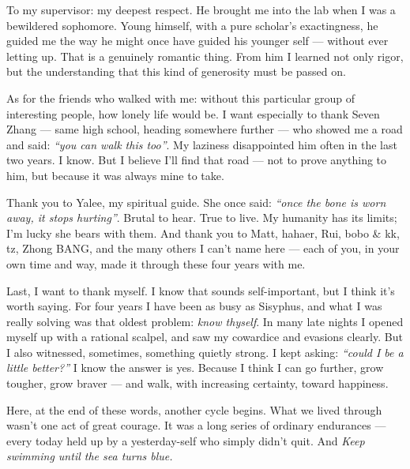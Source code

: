 To my supervisor: my deepest respect. He brought me into the lab when I was a bewildered sophomore. Young himself, with a pure scholar's exactingness, he guided me the way he might once have guided his younger self --- without ever letting up. That is a genuinely romantic thing. From him I learned not only rigor, but the understanding that this kind of generosity must be passed on.

As for the friends who walked with me: without this particular group of interesting people, how lonely life would be. I want especially to thank Seven Zhang --- same high school, heading somewhere further --- who showed me a road and said: \textit{``you can walk this too''}. My laziness disappointed him often in the last two years. I know. But I believe I'll find that road --- not to prove anything to him, but because it was always mine to take.

Thank you to Yalee, my spiritual guide. She once said: \textit{``once the bone is worn away, it stops hurting''}. Brutal to hear. True to live. My humanity has its limits; I'm lucky she bears with them. And thank you to Matt, hahaer, Rui, bobo \& kk, tz, Zhong BANG, and the many others I can't name here --- each of you, in your own time and way, made it through these four years with me.

Last, I want to thank myself. I know that sounds self-important, but I think it's worth saying. For four years I have been as busy as Sisyphus, and what I was really solving was that oldest problem: \textit{know thyself}. In many late nights I opened myself up with a rational scalpel, and saw my cowardice and evasions clearly. But I also witnessed, sometimes, something quietly strong. I kept asking: \textit{``could I be a little better?''} I know the answer is yes. Because I think I can go further, grow tougher, grow braver --- and walk, with increasing certainty, toward happiness.

Here, at the end of these words, another cycle begins. What we lived through wasn't one act of great courage. It was a long series of ordinary endurances --- every today held up by a yesterday-self who simply didn't quit. And \textit{Keep swimming until the sea turns blue.}
